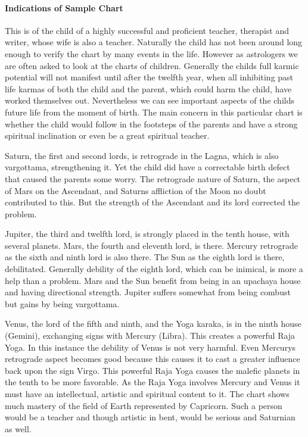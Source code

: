  

\paragraph{Indications of Sample Chart}

 

This is of the child of a highly successful and proficient teacher, therapist and writer, whose wife is also a teacher. Naturally the child has not been around long enough to verify the chart by many events in the life. However as astrologers we are often asked to look at the charts of children. Generally the childs full karmic potential will not manifest until after the twelfth year, when all inhibiting past life karmas of both the child and the parent, which could harm the child, have worked themselves out. Nevertheless we can see important aspects of the childs future life from the moment of birth. The main concern in this particular chart is whether the child would follow in the footsteps of the parents and have a strong spiritual inclination or even be a great spiritual teacher.

 

Saturn, the first and second lords, is retrograde in the Lagna, which is also vargottama, strengthening it. Yet the child did have a correctable birth defect that caused the parents some worry. The retrograde nature of Saturn, the aspect of Mars on the Ascendant, and Saturns affliction of the Moon no doubt contributed to this. But the strength of the Ascendant and its lord corrected the problem.

 

Jupiter, the third and twelfth lord, is strongly placed in the tenth house, with several planets. Mars, the fourth and eleventh lord, is there. Mercury retrograde as the sixth and ninth lord is also there. The Sun as the eighth lord is there, debilitated. Generally debility of the eighth lord, which can be inimical, is more a help than a problem. Mars and the Sun benefit from being in an upachaya house and having directional strength. Jupiter suffers somewhat from being combust but gains by being vargottama.

 

Venus, the lord of the fifth and ninth, and the Yoga karaka, is in the ninth house (Gemini), exchanging signs with Mercury (Libra). This creates a powerful Raja Yoga. In this instance the debility of Venus is not very harmful. Even Mercurys retrograde aspect becomes good because this causes it to cast a greater influence back upon the sign Virgo. This powerful Raja Yoga causes the malefic planets in the tenth to be more favorable. As the Raja Yoga involves Mercury and Venus it must have an intellectual, artistic and spiritual content to it. The chart shows much mastery of the field of Earth represented by Capricorn. Such a person would be a teacher and though artistic in bent, would be serious and Saturnian as well.


